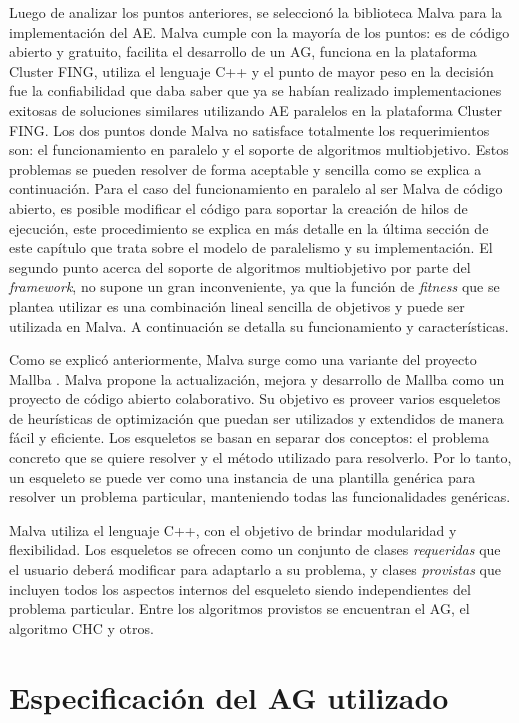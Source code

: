 Luego de analizar los puntos anteriores, se seleccionó la biblioteca Malva para la implementación del AE. Malva cumple con la mayoría de los puntos: es de código abierto y gratuito, facilita el desarrollo de un AG, funciona en la plataforma Cluster FING, utiliza el lenguaje C++ y el punto de mayor peso en la decisión fue la confiabilidad que daba saber que ya se habían realizado implementaciones exitosas de soluciones similares utilizando AE paralelos en la plataforma Cluster FING. Los dos puntos donde Malva no satisface totalmente los requerimientos son: el funcionamiento en paralelo y el soporte de algoritmos multiobjetivo. Estos problemas se pueden resolver de forma aceptable y sencilla como se explica a continuación. Para el caso del funcionamiento en paralelo al ser Malva de código abierto, es posible modificar el código para soportar la creación de hilos de ejecución, este procedimiento se explica en más detalle en la última sección de este capítulo que trata sobre el modelo de paralelismo y su implementación. El segundo punto acerca del soporte de algoritmos multiobjetivo por parte del \emph{framework}, no supone un gran inconveniente, ya que la función de \emph{fitness} que se plantea utilizar es una combinación lineal sencilla de objetivos y puede ser utilizada en Malva. 
A continuación se detalla su funcionamiento y características.

Como se explicó anteriormente, Malva \citep {Malva} surge como una variante del proyecto Mallba \citep{Mallba}. Malva propone la actualización, mejora y desarrollo de Mallba como un proyecto de código abierto colaborativo.  Su objetivo es proveer varios esqueletos de heurísticas de optimización que puedan ser utilizados y extendidos de manera fácil y eficiente. Los esqueletos se basan en separar dos conceptos: el problema concreto que se quiere resolver y el método utilizado para resolverlo. Por lo tanto, un esqueleto se puede ver como una instancia de una plantilla genérica para resolver un problema particular, manteniendo todas las funcionalidades genéricas.

Malva utiliza el lenguaje C++, con el objetivo de brindar modularidad y flexibilidad. Los esqueletos se ofrecen como un conjunto de clases \emph{requeridas} que el usuario deberá modificar para adaptarlo a su problema, y clases \emph{provistas} que incluyen todos los aspectos internos del esqueleto siendo  independientes del problema particular. Entre los algoritmos provistos se encuentran el AG, el algoritmo CHC \citep{CHC} y otros.


\section{Especificación del AG utilizado}

